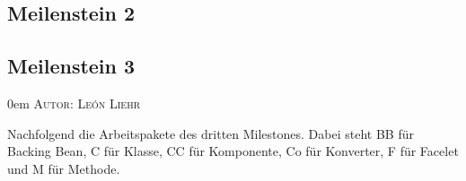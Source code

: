 \documentclass{article}
\makeatletter
\newcommand{\sectionauthor}[1]{
	{\parindent 0em \large \scshape Autor: #1 \par \nobreak \vspace*{1em}}
	\@afterheading
}
\makeatother
\begin{document}
\restoregeometry




\subsection{Meilenstein 2}
\newpage

\subsection{Meilenstein 3}
\sectionauthor{León Liehr}

Nachfolgend die Arbeitspakete des dritten Milestones. Dabei steht BB für Backing Bean, C für Klasse, CC für Komponente, Co für Konverter, F für Facelet und M für Methode.
\end{document}
